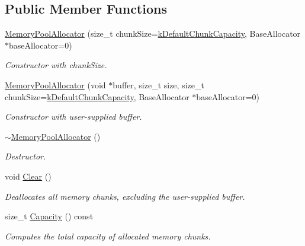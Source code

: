 \subsection*{Public Member Functions}
\begin{DoxyCompactItemize}
\item 
\mbox{\hyperlink{classrapidjson_1_1_memory_pool_allocator_a59d783f4feba17dcd35d9f25fcbc09f4}{Memory\+Pool\+Allocator}} (size\+\_\+t chunk\+Size=\mbox{\hyperlink{classrapidjson_1_1_memory_pool_allocator_aeee1e169678a23611887feded99007a2}{k\+Default\+Chunk\+Capacity}}, Base\+Allocator $\ast$base\+Allocator=0)
\begin{DoxyCompactList}\small\item\em Constructor with chunk\+Size. \end{DoxyCompactList}\item 
\mbox{\hyperlink{classrapidjson_1_1_memory_pool_allocator_abcc572bdb6902c9d69711540db5098a7}{Memory\+Pool\+Allocator}} (void $\ast$buffer, size\+\_\+t size, size\+\_\+t chunk\+Size=\mbox{\hyperlink{classrapidjson_1_1_memory_pool_allocator_aeee1e169678a23611887feded99007a2}{k\+Default\+Chunk\+Capacity}}, Base\+Allocator $\ast$base\+Allocator=0)
\begin{DoxyCompactList}\small\item\em Constructor with user-\/supplied buffer. \end{DoxyCompactList}\item 
\mbox{\hyperlink{classrapidjson_1_1_memory_pool_allocator_aa1d5b36c67611937e8ad6b2be53a483e}{$\sim$\+Memory\+Pool\+Allocator}} ()
\begin{DoxyCompactList}\small\item\em Destructor. \end{DoxyCompactList}\item 
void \mbox{\hyperlink{classrapidjson_1_1_memory_pool_allocator_aa050d52c62503ca6d6f66289ce83a18e}{Clear}} ()
\begin{DoxyCompactList}\small\item\em Deallocates all memory chunks, excluding the user-\/supplied buffer. \end{DoxyCompactList}\item 
size\+\_\+t \mbox{\hyperlink{classrapidjson_1_1_memory_pool_allocator_acdf0fc08cbcd940205a0a6289f1c58bd}{Capacity}} () const
\begin{DoxyCompactList}\small\item\em Computes the total capacity of allocated memory chunks. \end{DoxyCompactList}\item 

\end{DoxyCompactItemize}

